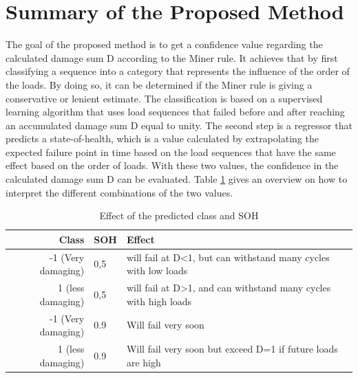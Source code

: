 \section{Summary of the Proposed Method}
The goal of the proposed method is to get a confidence value regarding the calculated damage sum D according to the Miner rule. It achieves that by first classifying a sequence into a category that represents the influence of the order of the loads. By doing so, it can be determined if the Miner rule is giving a conservative or lenient estimate. The classification is based on a supervised learning algorithm that uses load sequences that failed before and after reaching an accumulated damage sum D equal to unity. The second step is a regressor that predicts a state-of-health, which is a value calculated by extrapolating the expected failure point in time based on the load sequences that have the same effect based on the order of loads. With these two values, the confidence in the calculated damage sum D can be evaluated.
Table \ref{cases} gives an overview on how to interpret the different combinations of the two values. 

\begin{table}
	\begin{center}
		\begin{tabular}{|| r | l | l ||}
			\hline
			\rule{0pt}{2ex}Class & SOH & Effect\\
			\hline
			\hline
			\rule{0pt}{2ex}-1 (Very damaging)&  0,5 & will fail at D<1, but can withstand many cycles with low loads\\\hline
			1 (less damaging)& 0,5 & will fail at D>1, and can withstand many cycles with high loads\\\hline
			-1 (Very damaging)& 0.9 & Will fail very soon\\\hline
			1 (less damaging)& 0.9 & Will fail very soon but exceed D=1 if future loads are high\\\hline
			\hline
		\end{tabular}
		\caption{Effect of the predicted class and SOH}
		\label{cases}
	\end{center}
	\vspace{-4mm}
\end{table}


\afterpage{\null\newpage}